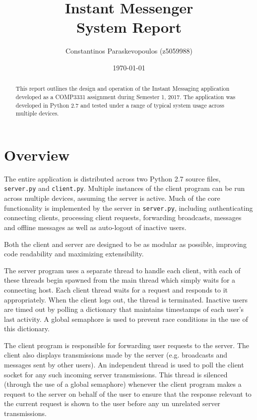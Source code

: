 \documentclass[12pt,a4paper]{article}
\title{Instant Messenger \\ \large System Report}
\author{Constantinos Paraskevopoulos (z5059988)}
\date{\today}
\begin{document}
\maketitle

\begin{abstract}
	This report outlines the design and operation of the Instant Messaging application developed as a COMP3331 assignment during Semester 1, 2017. The application was developed in Python 2.7 and tested under a range of typical system usage across multiple devices.
\end{abstract}

\section{Overview}
\label{sec:overview}

The entire application is distributed across two Python 2.7 source files, \verb|server.py| and \verb|client.py|. Multiple instances of the client program can be run across multiple devices, assuming the server is active. Much of the core functionality is implemented by the server in \verb|server.py|, including authenticating connecting clients, processing client requests, forwarding broadcasts, messages and offline messages as well as auto-logout of inactive users.

Both the client and server are designed to be as modular as possible, improving code readability and maximizing extensibility.

The server program uses a separate thread to handle each client, with each of these threads begin spawned from the main thread which simply waits for a connecting host. Each client thread waits for a request and responds to it appropriately. When the client logs out, the thread is terminated. Inactive users are timed out by polling a dictionary that maintains timestamps of each user's last activity. A global semaphore is used to prevent race conditions in the use of this dictionary.

The client program is responsible for forwarding user requests to the server. The client also displays transmissions made by the server (e.g. broadcasts and messages sent by other users). An independent thread is used to poll the client socket for any such incoming server transmissions. This thread is silenced (through the use of a global semaphore) whenever the client program makes a request to the server on behalf of the user to ensure that the response relevant to the current request is shown to the user before any un unrelated server transmissions.
\end{document}
